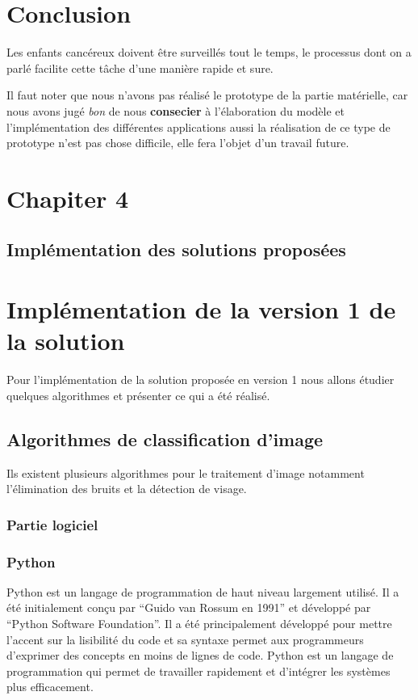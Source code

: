 \documentclass[12pt]{article}
\begin{document}
\newpage
\section{Conclusion}
Les enfants cancéreux doivent être surveillés tout le temps, le processus dont on a parlé facilite cette tâche d’une manière rapide et sure. 

Il faut noter que nous n'avons pas réalisé le prototype de la partie matérielle, car nous avons jugé \textit{bon} de nous \textbf{consecier} à l'élaboration du modèle et l'implémentation des différentes applications aussi la réalisation de ce type de prototype n'est pas chose difficile, elle fera l'objet d'un travail future.

\newpage
\rhead{}
\section*{\Huge{Chapiter 4}}
\subsection*{\huge{Implémentation des solutions proposées}}
\newpage
{}
\section{Implémentation de la version 1 de la solution}
Pour l'implémentation de la solution proposée en version 1 nous allons étudier quelques algorithmes et présenter ce qui a été réalisé.

\subsection{Algorithmes de classification d'image}
Ils existent plusieurs algorithmes pour le traitement d'image notamment l'élimination des bruits et la détection de visage.
\subsubsection{Partie logiciel}
\subsubsection*{Python}
Python est un langage de programmation de haut niveau largement utilisé. Il a été initialement conçu par “Guido van Rossum en 1991” et développé par “Python Software Foundation”. Il a été principalement développé pour mettre l'accent sur la lisibilité du code et sa syntaxe permet aux programmeurs d'exprimer des concepts en moins de lignes de code. Python est un langage de programmation qui permet de travailler rapidement et d’intégrer les systèmes plus efficacement.
\end{document}
